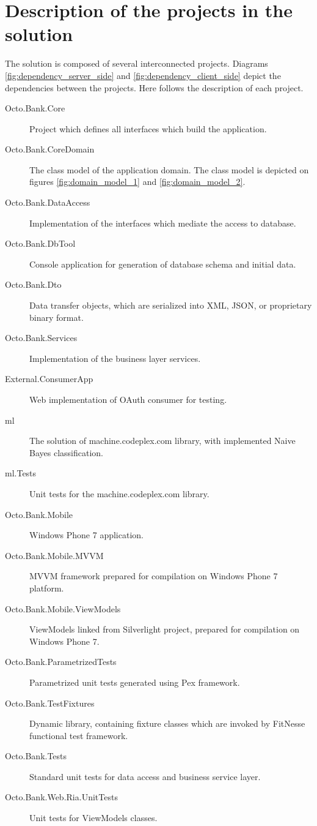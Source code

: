 \documentclass[11pt,twoside,a4paper]{book}
\begin{document}
\chapter{Description of the projects in the solution}
The solution is composed of several interconnected projects. Diagrams \ref{fig:dependency_server_side} and \ref{fig:dependency_client_side} depict the dependencies between the projects. Here follows the description of each project.
\begin{description}
	\item[Octo.Bank.Core] Project which defines all interfaces which build the application.
	\item[Octo.Bank.CoreDomain] The class model of the application domain. The class model is depicted on figures \ref{fig:domain_model_1} and \ref{fig:domain_model_2}.
	\item[Octo.Bank.DataAccess] Implementation of the interfaces which mediate the access to database.
	\item[Octo.Bank.DbTool] Console application for generation of database schema and initial data.
	\item[Octo.Bank.Dto] Data transfer objects, which are serialized into XML, JSON, or proprietary binary format.
	\item[Octo.Bank.Services] Implementation of the business layer services.
	\item[External.ConsumerApp] Web implementation of OAuth consumer for testing.
	\item[ml] The solution of machine.codeplex.com library, with implemented Naive Bayes classification.
	\item[ml.Tests] Unit tests for the machine.codeplex.com library.
	\item [Octo.Bank.Mobile] Windows Phone 7 application.
	\item [Octo.Bank.Mobile.MVVM] MVVM framework prepared for compilation on Windows Phone 7 platform.
	\item [Octo.Bank.Mobile.ViewModels] ViewModels linked from Silverlight project, prepared for compilation on Windows Phone 7.
	\item [Octo.Bank.ParametrizedTests] Parametrized unit tests generated using Pex framework.
	\item [Octo.Bank.TestFixtures] Dynamic library, containing fixture classes which are invoked by FitNesse functional test framework.
	\item [Octo.Bank.Tests] Standard unit tests for data access and business service layer.
	\item [Octo.Bank.Web.Ria.UnitTests] Unit tests for ViewModels classes.

\end{description}
\end{document}
